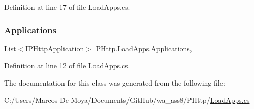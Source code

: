 Definition at line 17 of file Load\+Apps.\+cs.

\mbox{\label{class_p_http_1_1_load_apps_a2925a181db311314bdad41dbf0a6fce8}} 
\subsubsection{\texorpdfstring{Applications}{Applications}}
{\footnotesize\ttfamily List$<$\hyperlink{interface_p_http_1_1_i_p_http_application}{I\+P\+Http\+Application}$>$ P\+Http.\+Load\+Apps.\+Applications\hspace{0.3cm}{\ttfamily [get]}, {\ttfamily [set]}}



Definition at line 12 of file Load\+Apps.\+cs.



The documentation for this class was generated from the following file\+:\begin{DoxyCompactItemize}
\item 
C\+:/\+Users/\+Marcos De Moya/\+Documents/\+Git\+Hub/wa\+\_\+ass8/\+P\+Http/\hyperlink{_load_apps_8cs}{Load\+Apps.\+cs}\end{DoxyCompactItemize}

